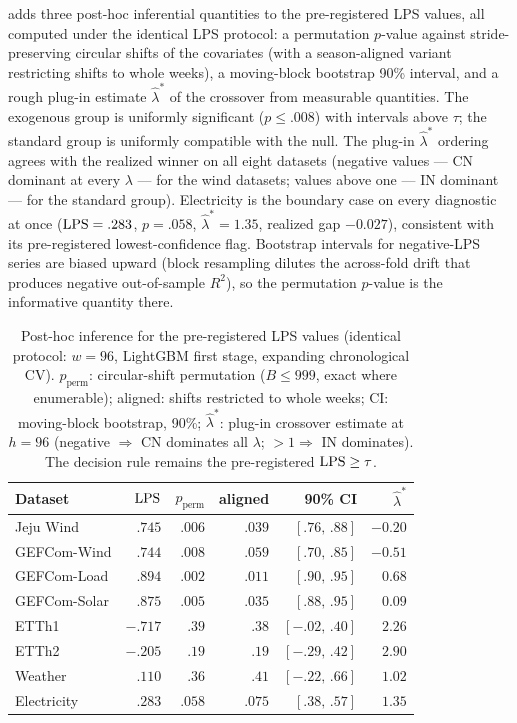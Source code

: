  adds three post-hoc inferential quantities to the
pre-registered LPS values, all computed under the identical LPS protocol:
a permutation $p$-value against stride-preserving circular shifts of the
covariates (with a season-aligned variant restricting shifts to whole
weeks), a moving-block bootstrap 90\% interval, and a rough plug-in
estimate $\hat{\lambda}^{*}$ of the crossover from measurable quantities.
The exogenous group is uniformly significant ($p \le .008$) with intervals
above $\tau$; the standard group is uniformly compatible with the null.
The plug-in $\hat{\lambda}^{*}$ ordering agrees with the realized winner
on all eight datasets (negative values --- CN dominant at every $\lambda$
--- for the wind datasets; values above one --- IN dominant --- for the
standard group). Electricity is the boundary case on every diagnostic at
once ($\mathrm{LPS}=.283$, $p=.058$, $\hat{\lambda}^{*}=1.35$, realized gap
$-0.027$), consistent with its pre-registered lowest-confidence flag.
Bootstrap intervals for negative-LPS series are biased upward (block
resampling dilutes the across-fold drift that produces negative
out-of-sample $R^2$), so the permutation $p$-value is the informative
quantity there.

\begin{table}[htbp]
\centering
\caption{Post-hoc inference for the pre-registered LPS values (identical
protocol: $w=96$, LightGBM first stage, expanding chronological CV).
$p_{\mathrm{perm}}$: circular-shift permutation ($B \le 999$, exact where
enumerable); aligned: shifts restricted to whole weeks; CI: moving-block
bootstrap, 90\%; $\hat{\lambda}^{*}$: plug-in crossover estimate at
$h=96$ (negative $\Rightarrow$ CN dominates all $\lambda$;
$>1 \Rightarrow$ IN dominates). The decision rule remains the
pre-registered $\mathrm{LPS} \ge \tau$.}
\label{tab:lpsinf}
\small
\begin{tabular}{@{}lrrrrr@{}}
\toprule
Dataset & $\mathrm{LPS}$ & $p_{\mathrm{perm}}$ & aligned & 90\% CI & $\hat{\lambda}^{*}$ \\
\midrule
Jeju Wind    & $.745$  & $.006$ & $.039$ & $[.76,\,.88]$ & $-0.20$ \\
GEFCom-Wind  & $.744$  & $.008$ & $.059$ & $[.70,\,.85]$ & $-0.51$ \\
GEFCom-Load  & $.894$  & $.002$ & $.011$ & $[.90,\,.95]$ & $0.68$ \\
GEFCom-Solar & $.875$  & $.005$ & $.035$ & $[.88,\,.95]$ & $0.09$ \\
ETTh1        & $-.717$ & $.39$  & $.38$  & $[-.02,\,.40]$ & $2.26$ \\
ETTh2        & $-.205$ & $.19$  & $.19$  & $[-.29,\,.42]$ & $2.90$ \\
Weather      & $.110$  & $.36$  & $.41$  & $[-.22,\,.66]$ & $1.02$ \\
Electricity  & $.283$  & $.058$ & $.075$ & $[.38,\,.57]$ & $1.35$ \\
\bottomrule
\end{tabular}
\end{table}
